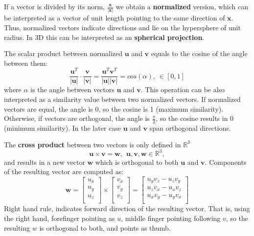 If a vector is divided by its norm, $\frac{\mathbf{x}}{ \vert \mathbf{x} \vert }$ we obtain a \textbf{normalized} version, which can be interpreted as a vector of unit length pointing to the same direction of $\mathbf{x}$. Thus, normalized vectors indicate directions and lie on the hypersphere of unit radius. In 3D this can be interpreted as an \textbf{spherical projection}.

The scalar product between normalized $\mathbf{u}$ and $\mathbf{v}$ equals to the cosine of the angle between them:
\begin{equation}
 \frac{\mathbf{u}^T}{\vert \mathbf{u} \vert} \cdot \frac{\mathbf{v}}{\vert \mathbf{v} \vert} = 
 \frac{\mathbf{u}^T\mathbf{v}^T}{\vert \mathbf{u} \vert \vert \mathbf{v} \vert} =
 cos (\alpha) , \ \in [0,1]
\end{equation}
where $\alpha$ is the angle between vectors $\mathbf{u}$ and $\mathbf{v}$. This operation can be also interpreted as a similarity value between two normalized vectors. If normalized vectors are equal, the angle is 0, so the cosine is 1 (maximum similarity). Otherwise, if vectors are orthogonal, the angle is $\frac{\pi}{2}$, so the cosine results in 0 (minimum similarity). In the later case $\mathbf{u}$ and $\mathbf{v}$ span orthogonal directions. 

The \textbf{cross product} between two vectors is only defined in $\mathbb{R}^3$
\begin{equation}
 \mathbf{u} \times \mathbf{v} = \mathbf{w} , \ \ \mathbf{u},\mathbf{v},\mathbf{w} \in \mathbb{R}^3, 
\end{equation}
and results in a new vector $\mathbf{w}$ which is orthogonal to both $\mathbf{u}$ and $\mathbf{v}$. Components of the resulting vector are computed as: 
\begin{equation}
\mathbf{w} = 
\left[
\begin{array}{ccc}
  u_x\\
  u_y\\
  u_z\\
\end{array}
\right]
\times
\left[
\begin{array}{ccc}
  v_x\\
  v_y\\
  v_z\\
\end{array}
\right]
 = 
\left[
\begin{array}{ccc}
  u_y v_z - u_z v_y\\
  u_z v_x - u_x v_z\\
  u_x v_y - u_y v_x\\
\end{array}
\right]
 \end{equation}
Right hand rule, indicates forward direction of the resulting vector. That is, using the right hand, forefinger pointing as $u$, middle finger pointing following $v$, so the resulting $w$ is orthogonal to both, and points as thumb. 

